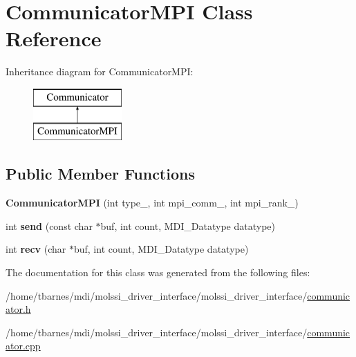 \hypertarget{classCommunicatorMPI}{\section{Communicator\-M\-P\-I Class Reference}
\label{classCommunicatorMPI}
}
Inheritance diagram for Communicator\-M\-P\-I\-:\begin{figure}[H]
\begin{center}
\leavevmode
\includegraphics[height=2.000000cm]{classCommunicatorMPI}
\end{center}
\end{figure}
\subsection*{Public Member Functions}
\begin{DoxyCompactItemize}
\item 
\hypertarget{classCommunicatorMPI_aa07167a7e2dcebc0c9050ce1c18f3f32}{{\bfseries Communicator\-M\-P\-I} (int type\-\_\-, int mpi\-\_\-comm\-\_\-, int mpi\-\_\-rank\-\_\-)}\label{classCommunicatorMPI_aa07167a7e2dcebc0c9050ce1c18f3f32}

\item 
\hypertarget{classCommunicatorMPI_afd20883bec05ee4a5d97154a731a13cb}{int {\bfseries send} (const char $\ast$buf, int count, M\-D\-I\-\_\-\-Datatype datatype)}\label{classCommunicatorMPI_afd20883bec05ee4a5d97154a731a13cb}

\item 
\hypertarget{classCommunicatorMPI_ab0852541ca8f78fd3fc32e167386d76d}{int {\bfseries recv} (char $\ast$buf, int count, M\-D\-I\-\_\-\-Datatype datatype)}\label{classCommunicatorMPI_ab0852541ca8f78fd3fc32e167386d76d}

\end{DoxyCompactItemize}


The documentation for this class was generated from the following files\-:\begin{DoxyCompactItemize}
\item 
/home/tbarnes/mdi/molssi\-\_\-driver\-\_\-interface/molssi\-\_\-driver\-\_\-interface/\hyperlink{communicator_8h}{communicator.\-h}\item 
/home/tbarnes/mdi/molssi\-\_\-driver\-\_\-interface/molssi\-\_\-driver\-\_\-interface/\hyperlink{communicator_8cpp}{communicator.\-cpp}\end{DoxyCompactItemize}
